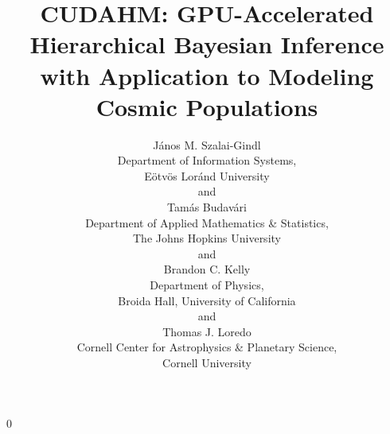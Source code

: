 \documentclass[12pt]{article}
\newcommand{\blind}{0}
\numberwithin{equation}{section}
\numberwithin{figure}{section}
\numberwithin{table}{section}
\begin{document}
\def\spacingset#1{\renewcommand{\baselinestretch}%
{#1}\small\normalsize} \spacingset{1}

\blind
{
  \title{\bf CUDAHM:  GPU-Accelerated Hierarchical Bayesian Inference
  with Application to Modeling Cosmic Populations}
  \author{J\'anos M. Szalai-Gindl\\
    Department of Information Systems,\\
    E\"otv\"os Lor\'and University\\
    and \\
    Tam\'as Budav\'ari \\
    Department of Applied Mathematics \& Statistics,\\
    The Johns Hopkins University\\
    and \\
    Brandon C. Kelly \\
    Department of Physics,\\
    Broida Hall, University of California\\
    and \\
    Thomas J. Loredo \\
    Cornell Center for Astrophysics \& Planetary Science,\\
    Cornell University \\%
}
    
  \maketitle
} \fi
\end{document}
